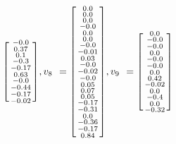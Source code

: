 \documentclass[a4paper,hidelinks,14pt]{extarticle}
\begin{document}
$$\begin{bsmallmatrix}
		-0.0\\ 
		0.37\\   
		0.1\\   
		-0.3\\  
		-0.17\\
		0.63\\ 
		-0.0\\ 
		-0.44\\
		-0.17\\ 
		-0.02\\ 
	\end{bsmallmatrix},
		v_{8\phantom{1}}=\begin{bsmallmatrix}
		0.0\\         
		0.0\\         
		0.0\\         
		-0.0\\       
		0.0\\         
		0.0\\        
		-0.0\\       
		-0.01\\      
		0.03\\      
		-0.0\\      
		-0.02\\     
		-0.0\\      
		0.05\\        
		0.07\\        
		0.05\\       
		-0.17\\    
		-0.31\\     
		0.0\\       
		-0.36\\    
		-0.17\\     
		0.84\\      
	\end{bsmallmatrix},
		v_{9\phantom{1}}=\begin{bsmallmatrix}
		0.0\\  
		-0.0\\ 
		-0.0\\ 
		0.0\\  
		-0.0\\ 
		-0.0\\ 
		0.0\\  
		0.42\\ 
		-0.02\\
		0.0\\  
		-0.4\\ 
		0.0\\  
		-0.32\\

\end{bsmallmatrix}$$
\end{document}
